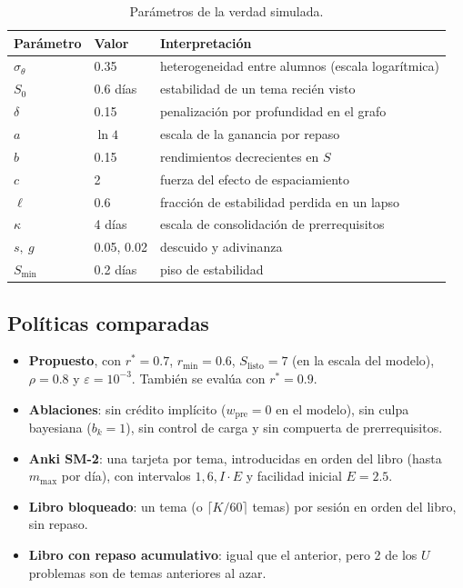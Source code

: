 \documentclass[11pt]{article}
\theoremstyle{definition}
\theoremstyle{remark}
\newcommand{\rstar}{r^{\ast}}
\newcommand{\Slisto}{S_{\mathrm{listo}}}
\newcommand{\Smin}{S_{\min}}
\begin{document}
\begin{table}[t]
\centering\small
\caption{Parámetros de la verdad simulada.}
\label{tab:param-verdad}
\begin{tabular}{lll}
\toprule
Parámetro & Valor & Interpretación \\
\midrule
$\sigma_\theta$ & 0.35 & heterogeneidad entre alumnos (escala logarítmica) \\
$S_0$ & 0.6 días & estabilidad de un tema recién visto \\
$\delta$ & 0.15 & penalización por profundidad en el grafo \\
$a$ & $\ln 4$ & escala de la ganancia por repaso \\
$b$ & 0.15 & rendimientos decrecientes en $S$ \\
$c$ & 2 & fuerza del efecto de espaciamiento \\
$\ell$ & 0.6 & fracción de estabilidad perdida en un lapso \\
$\kappa$ & 4 días & escala de consolidación de prerrequisitos \\
$s,\ g$ & 0.05, 0.02 & descuido y adivinanza \\
$\Smin$ & 0.2 días & piso de estabilidad \\
\bottomrule
\end{tabular}
\end{table}

\subsection{Políticas comparadas}

\begin{itemize}
\item \textbf{Propuesto}, con $\rstar=0.7$, $r_{\min}=0.6$, $\Slisto=7$ (en la escala del modelo), $\rho=0.8$ y $\varepsilon=10^{-3}$. También se evalúa con $\rstar=0.9$.
\item \textbf{Ablaciones}: sin crédito implícito ($w_{\mathrm{pre}}=0$ en el modelo), sin culpa bayesiana ($b_k=1$), sin control de carga y sin compuerta de prerrequisitos.
\item \textbf{Anki SM-2}: una tarjeta por tema, introducidas en orden del libro (hasta $m_{\max}$ por día), con intervalos $1, 6, I\cdot E$ y facilidad inicial $E=2.5$.
\item \textbf{Libro bloqueado}: un tema (o $\lceil K/60\rceil$ temas) por sesión en orden del libro, sin repaso.
\item \textbf{Libro con repaso acumulativo}: igual que el anterior, pero 2 de los $U$ problemas son de temas anteriores al azar.
\end{itemize}
\end{document}
